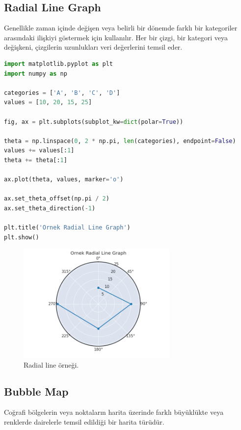 \newpage

\subsection{Radial Line Graph}
Genellikle zaman içinde değişen veya belirli bir dönemde farklı bir kategoriler arasındaki ilişkiyi göstermek için kullanılır. Her bir çizgi, bir kategori veya değişkeni, çizgilerin uzunlukları veri değerlerini temsil eder.

\begin{lstlisting}[language=Python]
import matplotlib.pyplot as plt
import numpy as np

categories = ['A', 'B', 'C', 'D']
values = [10, 20, 15, 25]

fig, ax = plt.subplots(subplot_kw=dict(polar=True))

theta = np.linspace(0, 2 * np.pi, len(categories), endpoint=False)
values += values[:1]
theta += theta[:1]

ax.plot(theta, values, marker='o')

ax.set_theta_offset(np.pi / 2)
ax.set_theta_direction(-1)

plt.title('Ornek Radial Line Graph')
plt.show()
\end{lstlisting}

\begin{figure}[h]
    \centering
    \includegraphics[width=0.7\textwidth]{images/radial_line_graph.png}
    \caption{Radial line örneği.}
    \label{fig:enter-label}
\end{figure}

\newpage

\subsection{Bubble Map}
Coğrafi bölgelerin veya noktaların harita üzerinde farklı büyüklükte veya renklerde dairelerle temsil edildiği bir harita türüdür.

